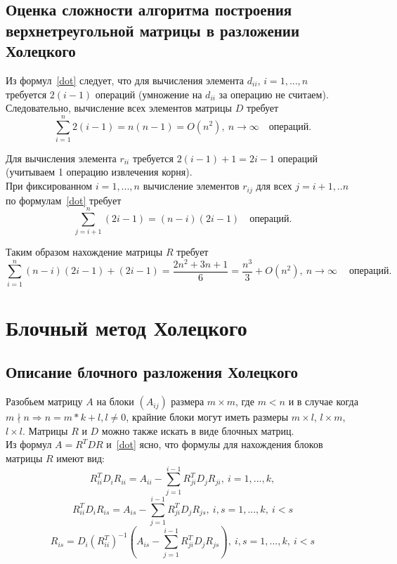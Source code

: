 \documentclass[a4paper,12pt]{article}
\begin{document}
\newpage
\subsection{Оценка сложности алгоритма построения верхнетреугольной матрицы
в разложении Холецкого}

    Из формул~\eqref{dot} следует, что для вычисления элемента $d_{ii}$, $i=1,...,n$\\
    требуется $2 (i-1)$ операций (умножение на $d_{ii}$ за операцию не считаем). \\
    Следовательно, вычисление всех элементов матрицы $D$ требует \\
    $$
        \sum_{i=1}^n 2(i-1) = n(n-1) = O(n^2), \
        n \rightarrow \infty 
        \quad \text{операций.}
    $$
    
    Для вычисления элемента $r_{ii}$ требуется $2 (i-1) + 1 = 2i - 1$ операций 
    (учитываем 1 операцию извлечения корня). \\
    При фиксированном $i=1,...,n$ вычисление элементов $r_{ij}$ для всех 
    $j=i+1,..n$ по формулам~\eqref{dot} требует 
    $$\sum_{j=i+1}^n(2i - 1) = (n-i)(2i - 1) \quad \text{операций.}$$ 

    Таким образом нахождение матрицы $R$ требует 
    $$
        \sum_{i=1}^n(n-i)(2i - 1)+(2i - 1) = 
        \frac{2n^2 + 3n + 1}6  =  \frac{n^3}3 + O(n^2), \
        n \rightarrow \infty \
        \quad \text{операций.}
    $$



\newpage
\section{Блочный метод Холецкого}
\subsection{Описание блочного разложения Холецкого}
    Разобьем матрицу $A$ на блоки $(A_{ij})$ размера $m \times m$, где $m < n$ и 
    в случае когда $m \nmid n \Rightarrow n = m*k + l, l \neq 0$, 
    крайние блоки могут иметь размеры $m \times l$, $l \times m$, $l \times l$. 
    Матрицы $R$ и $D$ можно также искать в виде блочных матриц. \\
    
    Из формул $A = R^TDR$ и~\eqref{dot} ясно, что формулы для нахождения блоков 
    матрицы $R$ имеют вид:
    \begin{equation} \label{block_i}
        R_{ii}^T D_i R_{ii}  = A_{ii} - 
        \sum_{j=1}^{i-1} R_{ji}^T D_j R_{ji},\  
        i=1,...,k,
     \end{equation}
    $$
        R_{ii}^T D_i R_{is}  = A_{is} - 
        \sum_{j=1}^{i-1} R_{ji}^T D_j R_{js},\  
        i, s = 1,...,k, \ i < s
    $$
    \begin{equation} \label{block_is}
        R_{is} = D_i(R_{ii}^T)^{-1}(A_{is} - 
        \sum_{j=1}^{i-1} R_{ji}^T D_j R_{js}),\  
        i, s = 1,...,k, \ i < s
    \end{equation}
    
\end{document}
